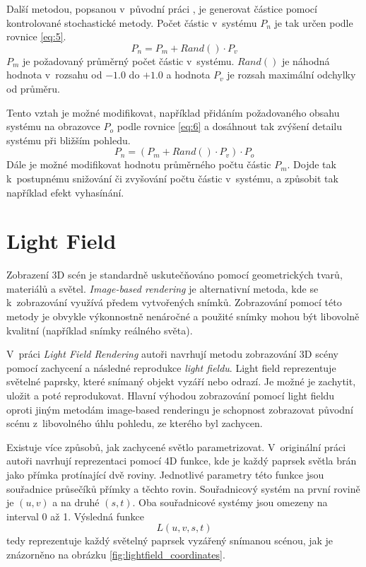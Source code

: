 Další metodou, popsanou v~původní práci \cite{reeves1983particle}, je generovat částice pomocí kontrolované stochastické metody. Počet částic v~systému \(P_n\) je tak určen podle rovnice \ref{eq:5}.
\begin{equation}
P_n = P_m + Rand() \cdot P_v
\label{eq:5}
\end{equation}
\(P_m\) je požadovaný průměrný počet částic v~systému. \(Rand()\) je náhodná hodnota v~rozsahu od \(-1.0\) do \(+1.0\) a hodnota \(P_v\) je rozsah maximální odchylky od průměru. 

Tento vztah je možné modifikovat, například přidáním požadovaného obsahu systému na obrazovce \(P_o\) podle rovnice \ref{eq:6} a dosáhnout tak zvýšení detailu systému při bližším pohledu. 
\begin{equation}
P_n = (P_m + Rand() \cdot P_v) \cdot P_o
\label{eq:6}
\end{equation}
Dále je možné modifikovat hodnotu průměrného počtu částic \(P_m\). Dojde tak k~postupnému snižování či zvyšování počtu částic v~systému, a způsobit tak například efekt vyhasínání.


\section{Light Field}
Zobrazení 3D scén je standardně uskutečňováno pomocí geometrických tvarů, materiálů a světel. \emph{Image-based rendering} je alternativní metoda, kde se k~zobrazování využívá předem vytvořených snímků. Zobrazování pomocí této metody je obvykle výkonnostně nenáročné a použité snímky mohou být libovolně kvalitní (například snímky reálného světa). 

V~práci \emph{Light Field Rendering} \cite{levoy1996light} autoři navrhují metodu zobrazování 3D scény pomocí zachycení a následné reprodukce \emph{light fieldu}. Light field reprezentuje světelné paprsky, které snímaný objekt vyzáří nebo odrazí. Je možné je zachytit, uložit a poté reprodukovat. Hlavní výhodou zobrazování pomocí light fieldu oproti jiným metodám image-based renderingu je schopnost zobrazovat původní scénu z~libovolného úhlu pohledu, ze kterého byl zachycen. 

Existuje více způsobů, jak zachycené světlo parametrizovat.  V~originální práci autoři navrhují reprezentaci pomocí 4D funkce, kde je každý paprsek světla brán jako přímka protínající dvě roviny. Jednotlivé parametry této funkce jsou souřadnice průsečíků přímky a těchto rovin. Souřadnicový systém na první rovině je \((u,v)\) a na druhé \((s,t)\). Oba souřadnicové systémy jsou omezeny na interval 0 až 1. Výsledná funkce
\[L(u,v,s,t)\]
tedy reprezentuje každý světelný paprsek vyzářený snímanou scénou, jak je znázorněno na obrázku \ref{fig:lightfield_coordinates}. 


